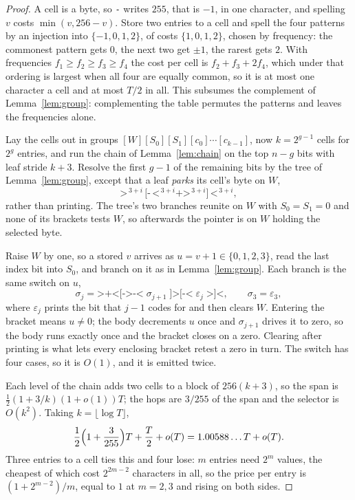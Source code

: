 \documentclass[11pt]{article}
\theoremstyle{remark}
\begin{document}
\begin{proof}
A cell is a byte, so \texttt{-} writes $255$, that is $-1$, in one character,
and spelling $v$ costs $\min(v,256-v)$.  Store two entries to a cell and
spell the four patterns by an injection into $\{-1,0,1,2\}$, of costs
$\{1,0,1,2\}$, chosen by frequency: the commonest pattern gets $0$, the next
two get $\pm1$, the rarest gets $2$.  With frequencies
$f_1\ge f_2\ge f_3\ge f_4$ the cost per cell is $f_2+f_3+2f_4$, which under
that ordering is largest when all four are equally common, so it is at most
one character a cell and at most $T/2$ in all.  This subsumes the complement
of Lemma~\ref{lem:group}: complementing the table permutes the patterns and
leaves the frequencies alone.

Lay the cells out in groups $[W][S_0][S_1][c_0]\cdots[c_{k-1}]$, now
$k=2^{g-1}$ cells for $2^{g}$ entries, and run the chain of
Lemma~\ref{lem:chain} on the top $n-g$ bits with leaf stride $k+3$.  Resolve
the first $g-1$ of the remaining bits by the tree of Lemma~\ref{lem:group},
except that a leaf \emph{parks} its cell's byte on $W$,
\[
  \texttt{>}^{\,3+i}\,\texttt{[-}\,\texttt{<}^{\,3+i}\texttt{+}
  \texttt{>}^{\,3+i}\texttt{]}\,\texttt{<}^{\,3+i},
\]
rather than printing.  The tree's two branches reunite on $W$ with
$S_0=S_1=0$ and none of its brackets tests $W$, so afterwards the pointer is
on $W$ holding the selected byte.

Raise $W$ by one, so a stored $v$ arrives as $u=v+1\in\{0,1,2,3\}$, read the
last index bit into $S_0$, and branch on it as in Lemma~\ref{lem:group}.
Each branch is the same switch on $u$,
\[
  \sigma_j=\texttt{>+<[->-<}\;\sigma_{j+1}\;\texttt{]>[-<}\;\varepsilon_j\;
  \texttt{>]<},\qquad \sigma_3=\varepsilon_3,
\]
where $\varepsilon_j$ prints the bit that $j-1$ codes for and then clears $W$.
Entering the bracket means $u\ne0$; the body decrements $u$ once and
$\sigma_{j+1}$ drives it to zero, so the body runs exactly once and the
bracket closes on a zero.  Clearing after printing is what lets every
enclosing bracket retest a zero in turn.  The switch has four cases, so it is
$O(1)$, and it is emitted twice.

Each level of the chain adds two cells to a block of $256(k+3)$, so the span
is $\frac12(1+3/k)(1+o(1))T$; the hops are $3/255$ of the span and the
selector is $O(k^2)$.  Taking $k=\lfloor\log T\rfloor$,
\[
  \frac12\Bigl(1+\frac3{255}\Bigr)T+\frac T2+o(T)=1.00588\ldots T+o(T).
\]
Three entries to a cell ties this and four lose: $m$ entries need $2^m$
values, the cheapest of which cost $2^{2m-2}$ characters in all, so the price
per entry is $(1+2^{m-2})/m$, equal to $1$ at $m=2,3$ and rising on both
sides.\qedhere
\end{proof}
\end{document}
